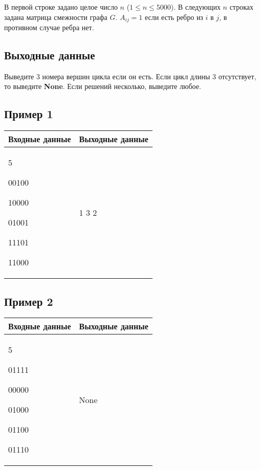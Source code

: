 \documentclass{extarticle}
\begin{document}
В первой строке задано целое число \(n\) (\(1 \leq n \leq 5000\)).
В следующих \(n\) строках задана матрица смежности графа \(G\).
\(A_{ij}=1\) если есть ребро из \(i\) в \(j\), в противном случае ребра нет.

\subsection*{Выходные данные}
\label{sec:org75f0d83}

Выведите 3 номера вершин цикла если он есть. Если цикл длины 3 отсутствует, то
выведите \textbf{None}.
Если решений несколько, выведите любое.

\subsection*{Пример 1}
\label{sec:org2fcdd98}

\begin{table}[H]
\begin{center}
\begin{tabular}{|m{4cm}|m{4cm}|}
\hline
Входные данные & Выходные данные \\ \hline
5

00100

10000

01001

11101

11000
&
1 3 2
\\ \hline
\end{tabular}
\end{center}
\end{table}

\subsection*{Пример 2}
\label{sec:org96d1f76}

\begin{table}[H]
\begin{center}
\begin{tabular}{|m{4cm}|m{4cm}|}
\hline
Входные данные & Выходные данные \\ \hline
5

01111

00000

01000

01100

01110
&
None
\\ \hline
\end{tabular}
\end{center}
\end{table}

\pagebreak
\end{document}
